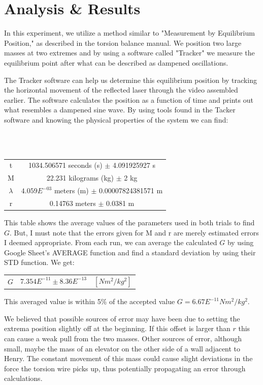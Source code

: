 \documentclass[a4paper,12pt,english]{all-in-one} %
\begin{document}
\section*{Analysis \& Results}
{
In this experiment, we utilize a method similar to "Measurement by Equilibrium Position," as described in the torsion balance manual. We position two large masses at two extremes and by using a software called "Tracker" we measure the equilibrium point after what can be described as dampened oscillations. 

The Tracker software can help us determine this equilibrium position by tracking the horizontal movement of the reflected laser through the video assembled earlier. The software calculates the position as a function of time and prints out what resembles a dampened sine wave. By using tools found in the Tacker software and knowing the physical properties of the system we can find:

\noindent
\\
\\
\begin{center}
{\begin{tabular}{c|c}
t & 1034.506571 seconds (s) $\pm$ 4.091925927 s\\
M & 22.231 kilograms (kg) $\pm$ 2 kg\\
$\lambda$ & $4.059E^{-03}$ meters (m) $\pm$ 0.00007824381571 m\\
r & 0.14763 meters $\pm$ 0.0381 m\\
\end{tabular}
}
\end{center}

\noindent
This table shows the average values of the parameters used in both trials to find $G$. But, I must note that the errors given for M and r are merely estimated errors I deemed appropriate. From each run, we can average the calculated $G$ by using Google Sheet's AVERAGE function and find a standard deviation by using their STD function. We get:

\begin{center}
{\begin{tabular}{c|c}
$G$ & $7.354E^{-11} \pm 8.36E^{-13} \quad [Nm^2/kg^2]$ 
\end{tabular}
}
\end{center}
This averaged value is within 5\% of the accepted value $G = 6.67E^{-11} Nm^2/kg^2$. 

We believed that possible sources of error may have been due to setting the extrema position slightly off at the beginning. If this offset is larger than $r$ this can cause a weak pull from the two masses. Other sources of error, although small, maybe the mass of an elevator on the other side of a wall adjacent to Henry. The constant movement of this mass could cause slight deviations in the force the torsion wire picks up, thus potentially propagating an error through calculations. 

}
\end{document}
